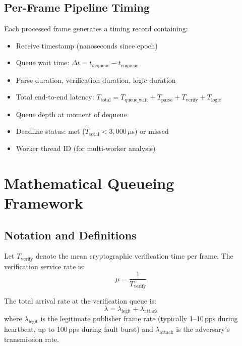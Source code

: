 \documentclass[journal]{IEEEtran}
\begin{document}
\subsection{Per-Frame Pipeline Timing}
Each processed frame generates a timing record containing:
\begin{itemize}[leftmargin=*]
    \item Receive timestamp (nanoseconds since epoch)
    \item Queue wait time: $\Delta t = t_{\text{dequeue}} - t_{\text{enqueue}}$
    \item Parse duration, verification duration, logic duration
    \item Total end-to-end latency: $T_{\text{total}} = T_{\text{queue\_wait}} + T_{\text{parse}} + T_{\text{verify}} + T_{\text{logic}}$
    \item Queue depth at moment of dequeue
    \item Deadline status: met ($T_{\text{total}} < 3{,}000\,\mu$s) or missed
    \item Worker thread ID (for multi-worker analysis)
\end{itemize}

\section{Mathematical Queueing Framework}

\subsection{Notation and Definitions}
Let $T_{\text{verify}}$ denote the mean cryptographic verification time per frame. The verification service rate is:
\begin{equation}
\mu = \frac{1}{T_{\text{verify}}}
\end{equation}

The total arrival rate at the verification queue is:
\begin{equation}
\lambda = \lambda_{\text{legit}} + \lambda_{\text{attack}}
\end{equation}
where $\lambda_{\text{legit}}$ is the legitimate publisher frame rate (typically 1--10\,pps during heartbeat, up to 100\,pps during fault burst) and $\lambda_{\text{attack}}$ is the adversary's transmission rate.
\end{document}
